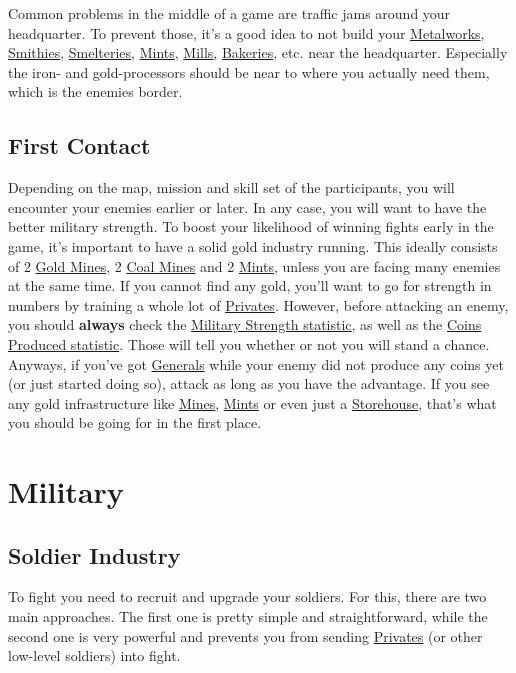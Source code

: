 \documentclass[12pt]{article}
\begin{document}
Common problems in the middle of a game are traffic jams around your headquarter. To prevent those, it's a good idea to not build your \hyperref[sec:metalworks]{Metalworks}, \hyperref[sec:smithy]{Smithies}, \hyperref[sec:smeltery]{Smelteries}, \hyperref[sec:mint]{Mints}, \hyperref[sec:mill]{Mills}, \hyperref[sec:bakery]{Bakeries}, etc. near the headquarter. Especially the iron- and gold-processors should be near to where you actually need them, which is the enemies border.

\subsection{First Contact}
\label{sec:firstcontact}

Depending on the map, mission and skill set of the participants, you will encounter your enemies earlier or later. In any case, you will want to have the better military strength. To boost your likelihood of winning fights  early in the game, it's important to have a solid gold industry running. This ideally consists of 2 \hyperref[sec:goldmine]{Gold Mines}, 2 \hyperref[sec:coalmine]{Coal Mines} and 2 \hyperref[sec:mint]{Mints}, unless you are facing many enemies at the same time. If you cannot find any gold, you'll want to go for strength in numbers by training a whole lot of \hyperref[sec:private]{Privates}. However, before attacking an enemy, you should \textbf{always} check the \hyperref[sec:statisticsmilitary]{Military Strength statistic}, as well as the \hyperref[sec:statisticscoins]{Coins Produced statistic}. Those will tell you whether or not you will stand a chance. Anyways, if you've got \hyperref[sec:general]{Generals} while your enemy did not produce any coins yet (or just started doing so), attack as long as you have the advantage. If you see any gold infrastructure like \hyperref[sec:goldmine]{Mines}, \hyperref[sec:mint]{Mints} or even just a \hyperref[sec:storehouse]{Storehouse}, that's what you should be going for in the first place.

\section{Military}
\label{sec:military}

\subsection{Soldier Industry}

To fight you need to recruit and upgrade your soldiers. For this, there are two main approaches. The first one is pretty simple and straightforward, while the second one is very powerful and prevents you from sending \hyperref[sec:privates]{Privates} (or other low-level soldiers) into fight.
\end{document}
